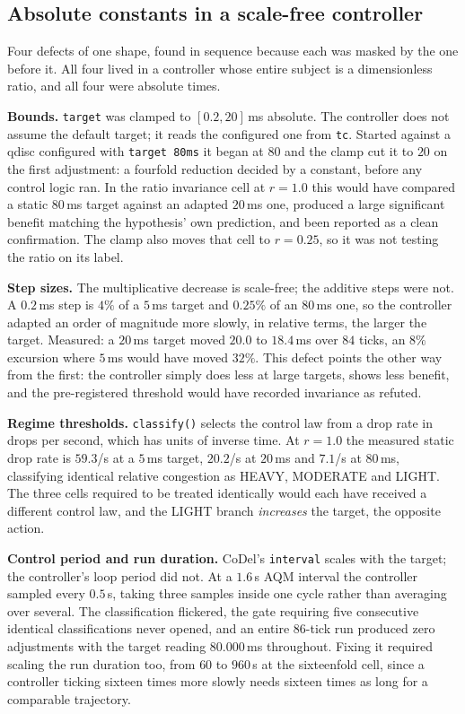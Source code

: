 \subsection{Absolute constants in a scale-free controller}
\label{sec:pitfall:scale}

Four defects of one shape, found in sequence because each was masked by the
one before it. All four lived in a controller whose entire subject is a
dimensionless ratio, and all four were absolute times.

\textbf{Bounds.} \texttt{target} was clamped to $[0.2, 20]$\,ms absolute. The
controller does not assume the default target; it reads the configured one from
\texttt{tc}. Started against a qdisc configured with \texttt{target 80ms} it
began at $80$ and the clamp cut it to $20$ on the first adjustment: a fourfold
reduction decided by a constant, before any control logic ran. In the ratio
invariance cell at $r = 1.0$ this would have compared a static $80$\,ms target
against an adapted $20$\,ms one, produced a large significant benefit matching
the hypothesis' own prediction, and been reported as a clean confirmation. The
clamp also moves that cell to $r = 0.25$, so it was not testing the ratio on
its label.

\textbf{Step sizes.} The multiplicative decrease is scale-free; the additive
steps were not. A $0.2$\,ms step is $4\%$ of a $5$\,ms target and $0.25\%$ of
an $80$\,ms one, so the controller adapted an order of magnitude more slowly,
in relative terms, the larger the target. Measured: a $20$\,ms target moved
$20.0$ to $18.4$\,ms over $84$ ticks, an $8\%$ excursion where $5$\,ms would
have moved $32\%$. This defect points the other way from the first: the
controller simply does less at large targets, shows less benefit, and the
pre-registered threshold would have recorded invariance as refuted.

\textbf{Regime thresholds.} \texttt{classify()} selects the control law from a
drop rate in drops per second, which has units of inverse time. At $r = 1.0$
the measured static drop rate is $59.3$/s at a $5$\,ms target, $20.2$/s at
$20$\,ms and $7.1$/s at $80$\,ms, classifying identical relative congestion as
HEAVY, MODERATE and LIGHT. The three cells required to be treated identically
would each have received a different control law, and the LIGHT branch
\emph{increases} the target, the opposite action.

\textbf{Control period and run duration.} CoDel's \texttt{interval} scales with
the target; the controller's loop period did not. At a $1.6$\,s AQM interval the
controller sampled every $0.5$\,s, taking three samples inside one cycle rather
than averaging over several. The classification flickered, the gate requiring
five consecutive identical classifications never opened, and an entire $86$-tick
run produced zero adjustments with the target reading $80.000$\,ms throughout.
Fixing it required scaling the run duration too, from $60$ to $960$\,s at the
sixteenfold cell, since a controller ticking sixteen times more slowly needs
sixteen times as long for a comparable trajectory.

